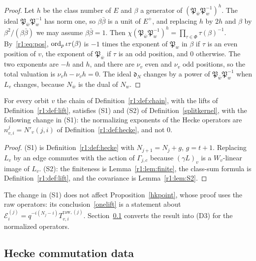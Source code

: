 \begin{proof}
Let $h$ be the class number of $E$ and $\beta$ a generator of $(\mathfrak P_{\bar w}\mathfrak P_w^{-1})^h$. The ideal $\mathfrak P_{\bar w}\mathfrak P_w^{-1}$ has norm one, so $\beta\bar\beta$ is a unit of $E^+$, and replacing $h$ by $2h$ and $\beta$ by $\beta^2/(\beta\bar\beta)$ we may assume $\beta\bar\beta=1$. Then $\chi(\mathfrak P_{\bar w}\mathfrak P_w^{-1})^{h}=\prod_{\tau\in\Phi}\tau(\beta)^{-1}$. By~\eqref{r1:eq:pos}, $\operatorname{ord}_p\iota\tau(\beta)$ is $-1$ times the exponent of $\mathfrak P_w$ in $\beta$ if $\tau$ is an even position of $v$, the exponent of $\mathfrak P_{\bar w}$ if $\tau$ is an odd position, and $0$ otherwise. The two exponents are $-h$ and $h$, and there are $\nu_v$ even and $\nu_v$ odd positions, so the total valuation is $\nu_vh-\nu_vh=0$. The ideal $\mathfrak d_N$ changes by a power of $\mathfrak P_{\bar w}\mathfrak P_w^{-1}$ when $L_v$ changes, because $N_{\bar w}$ is the dual of $N_w$.
\end{proof}

\begin{proposition}[(S1) and (S2)]\label{r1:prop:S1S2}
For every orbit $v$ the chain of Definition~\ref{r1:def:chain}, with the lifts of Definition~\ref{r1:def:lift}, satisfies (S1) and (S2) of Definition~\ref{splitkernel}, with the following change in (S1): the normalizing exponents of the Hecke operators are $n^j_{v,i}=N'_v(j,i)$ of Definition~\ref{r1:def:hecke}, and not $0$.
\end{proposition}

\begin{proof}
(S1) is Definition~\ref{r1:def:hecke} with $N_{j+1}=N_j+g$, $g=t+1$. Replacing $L_v$ by an edge commutes with the action of $\Gamma_{j,c}$ because $(\gamma L)_v$ is a $W_v$-linear image of $L_v$. (S2): the finiteness is Lemma~\ref{r1:lem:finite}, the class-sum formula is Definition~\ref{r1:def:lift}, and the covariance is Lemma~\ref{r1:lem:S2}.
\end{proof}

The change in (S1) does not affect Proposition~\ref{hkpoint}, whose proof uses the raw operators: its conclusion~\eqref{onelift} is a statement about $\mathcal E^{(j)}_i=q^{-i(N_j-i)}T^{\mathrm{raw},(j)}_{v,i}$. Section~\ref{r1:sec:R1hecke} converts the result into (D3) for the normalized operators.

\subsection{Hecke commutation data}\label{r1:sec:R1hecke}

